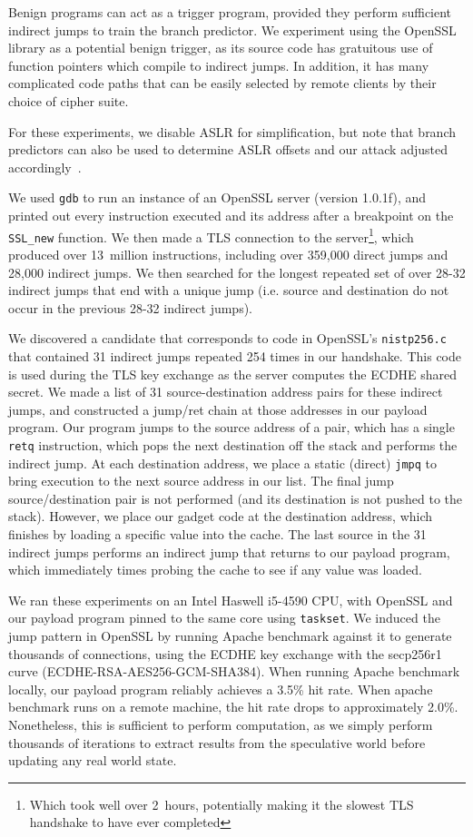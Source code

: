 Benign programs can act as a trigger program, provided they perform sufficient
indirect jumps to train the branch predictor. We experiment using the OpenSSL
library as a potential benign trigger, as its source code has gratuitous use of
function pointers which compile to indirect jumps. In addition, it has many
complicated code paths that can be easily selected by remote clients by their
choice of cipher suite.

For these experiments, we disable ASLR for simplification, but note that
branch predictors can also be used to determine ASLR offsets and our attack adjusted
accordingly~\cite{evtyushkin2016jump}.

We used \texttt{gdb} to run an instance of an OpenSSL server (version 1.0.1f),
and printed out every instruction executed and its address after a breakpoint on
the \texttt{SSL\_new} function. We then made a TLS connection to the
server\footnote{Which took well over 2~hours, potentially making it the slowest
TLS handshake to have ever completed},
which produced over 13~million instructions, including over 359,000 direct jumps
and 28,000 indirect jumps. We then searched for the longest repeated set of over
28-32 indirect jumps that end with a unique jump (i.e. source and destination do
not occur in the previous 28-32 indirect jumps).

We discovered a candidate that corresponds to code in OpenSSL's
\texttt{nistp256.c} that contained 31 indirect jumps repeated 254 times in our
handshake. This code is used during the TLS key exchange as the server computes
the ECDHE shared secret. We made a list of 31 source-destination address pairs
for these indirect jumps, and constructed a jump/ret chain at those addresses in
our payload program. Our program jumps to the source address of a pair,
which has a single \texttt{retq} instruction, which pops the next
destination off the stack and performs the indirect jump. At each destination
address, we place a static (direct) \texttt{jmpq} to bring execution to the
next source address in our list. The final jump source/destination pair is not
performed (and its destination is not pushed to the stack). However, we place
our gadget code at the destination address, which finishes by loading a specific value
into the cache.
The last source in the 31 indirect jumps performs an indirect jump that returns to our
payload program, which immediately times probing the cache to see if any value was
loaded.

We ran these experiments on an Intel Haswell
i5-4590 CPU, with OpenSSL and our payload program pinned to the same core using
\texttt{taskset}.
We induced the jump pattern in OpenSSL by running Apache benchmark against it to
generate thousands of connections, using the ECDHE key exchange with the
secp256r1 curve (ECDHE-RSA-AES256-GCM-SHA384). When running Apache benchmark locally, our payload program
reliably achieves a 3.5\% hit rate. When apache benchmark runs on a remote
machine, the hit rate drops to approximately 2.0\%. Nonetheless, this is
sufficient to perform computation, as we simply perform thousands of iterations
to extract results from the speculative world before updating any real world state.

